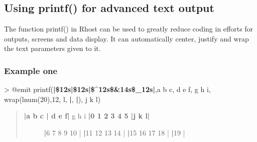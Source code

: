\documentclass[letterpaper,10pt,english]{sphinxmanual}
\begin{document}
\subsection{Using printf() for advanced text output}
\label{\detokenize{advanced:using-printf-for-advanced-text-output}}
\sphinxAtStartPar
The function printf() in Rhost can be used to greatly reduce coding in efforts for outputs,
screens and data display.  It can automatically center, justify and wrap the text parameters given to it.


\subsubsection{Example one}
\label{\detokenize{advanced:example-one}}
\sphinxAtStartPar
\textgreater{} @emit printf({\color{red}\bfseries{}|\$\sphinxhyphen{}12s|\$12s|\$\textasciicircum{}12s\$\&14s\$\_12s|},a b c, d e f, g h i, wrap(lnum(20),12, l, {\color{red}\bfseries{}|}, {\color{red}\bfseries{}|}), j k l)
\begin{quote}
\begin{description}
\item[{{\color{red}\bfseries{}|a b c       |       d e f|}   g h i    {\color{red}\bfseries{}|0 1 2 3 4 5 |j     k    l|}}] \leavevmode
\sphinxAtStartPar
{\color{red}\bfseries{}|}6 7 8 9 10  |
{\color{red}\bfseries{}|}11 12 13 14 |
{\color{red}\bfseries{}|}15 16 17 18 |
{\color{red}\bfseries{}|}19          |

\end{description}
\end{quote}
\end{document}
